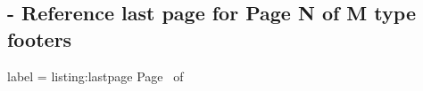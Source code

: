 
\subsection{ - Reference last page for Page N of M type footers}

\begin{tcblisting}{label = listing:lastpage}
  Page \thepage\ of \pageref{LastPage}
\end{tcblisting}
